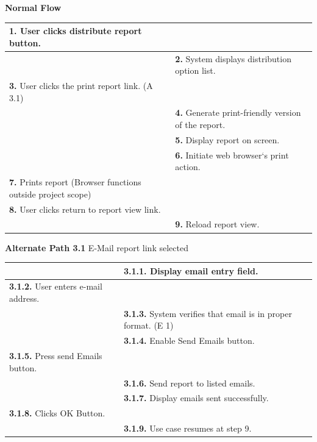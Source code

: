 \documentclass[letterpaper,12pt]{report}
\begin{document}
{ \centering \textbf{Normal Flow}
\begin{center}
\xuchead
\begin{tabular}{| p{8.5cm} | p{8.5cm} |}
\hline
\textbf{1.} User clicks distribute report button. & \\
\hline
& \textbf{2.} System\index{system} displays distribution option list. \\
\hline
\textbf{3.} User clicks the print report link. (A 3.1) & \\
\hline
& \textbf{4.} Generate print-friendly version of the report. \\
\hline
& \textbf{5.} Display report on screen. \\
\hline
& \textbf{6.} Initiate web browser`s print action. \\
\hline
\textbf{7.} Prints report (Browser functions outside project\index{project} scope) & \\
\hline
\textbf{8.} User clicks return to report view link. & \\
\hline
& \textbf{9.} Reload report view. \\
\hline
\end{tabular}
\end{center}
\pagebreak

\centering \textbf{Alternate Path 3.1}
\linebreak E-Mail report link selected
\begin{center}
\xuchead
\begin{tabular}{| p{8.5cm} | p{8.5cm} |}
\hline
& \textbf{3.1.1.} Display email entry field. \\
\hline
\textbf{3.1.2.} User enters e-mail address. & \\
\hline
& \textbf{3.1.3.} System\index{system} verifies that email is in proper format. (E 1)\\
\hline
& \textbf{3.1.4.} Enable Send Emails button. \\
\hline
\textbf{3.1.5.} Press send Emails button. & \\
\hline
& \textbf{3.1.6.} Send report to listed emails. \\
\hline
& \textbf{3.1.7.} Display emails sent successfully. \\
\hline
\textbf{3.1.8.} Clicks OK Button. & \\
\hline
& \textbf{3.1.9.} Use case\index{Use Case} resumes at step 9. \\
\hline
\end{tabular}
\end{center}

}
\end{document}
